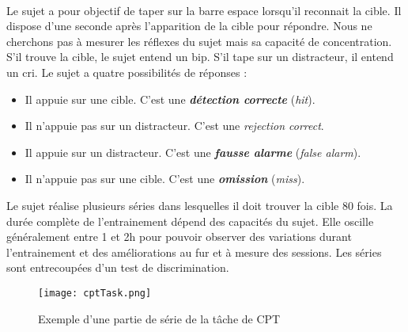 \paragraph{}Le sujet a pour objectif de taper sur la barre espace lorsqu'il reconnait la cible. Il dispose d'une seconde après l'apparition de la cible pour répondre. Nous ne cherchons
pas à mesurer les réflexes du sujet mais sa capacité de concentration. S'il trouve la cible, le sujet entend un bip. S'il tape sur un distracteur, il entend un cri. Le sujet a quatre
possibilités de réponses :
\begin{itemize}
\item Il appuie sur une cible. C'est une \textbf{\emph{détection correcte}} (\emph{hit}).
\item Il n'appuie pas sur un distracteur. C'est une \emph{rejection correct}.
\item Il appuie sur un distracteur. C'est une \textbf{\emph{fausse alarme}} (\emph{false alarm}).
\item Il n'appuie pas sur une cible. C'est une \textbf{\emph{omission}} (\emph{miss}).
\end{itemize}
Le sujet réalise plusieurs séries dans lesquelles il doit trouver la cible 80 fois. La durée complète de l'entrainement dépend des capacités du sujet. Elle oscille généralement entre
1 et 2h pour pouvoir observer des variations durant l'entrainement et des améliorations au fur et à mesure des sessions. Les séries sont entrecoupées d'un test de discrimination.

\begin{figure}[H]
    \begin{center}
    \texttt{[image: cptTask.png]}
    \end{center}
    \caption{Exemple d'une partie de série de la tâche de CPT}
\label{CptTask}
\end{figure}

